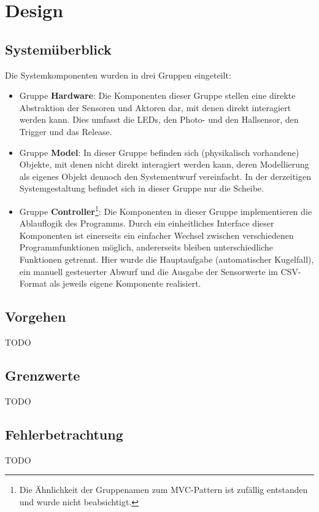 \chapter{Design}\label{k_design}
\section{Systemüberblick}
Die Systemkomponenten wurden in drei Gruppen eingeteilt:
\begin{itemize}
	\item Gruppe \textbf{Hardware}: Die Komponenten dieser Gruppe stellen eine direkte Abstraktion der Sensoren und Aktoren dar, mit denen direkt interagiert werden kann.
	Dies umfasst die LEDs, den Photo- und den Hallsensor, den Trigger und das Release.
	\item Gruppe \textbf{Model}: In dieser Gruppe befinden sich (physikalisch vorhandene) Objekte, mit denen nicht direkt interagiert werden kann, deren Modellierung als eigenes Objekt dennoch den Systementwurf vereinfacht.
	In der derzeitigen Systemgestaltung befindet sich in dieser Gruppe nur die Scheibe.
	\item Gruppe \textbf{Controller}\footnote{Die Ähnlichkeit der Gruppenamen zum MVC-Pattern ist zufällig entstanden und wurde nicht beabsichtigt.}:
	Die Komponenten in dieser Gruppe implementieren die Ablauflogik des Programms.
	Durch ein einheitliches Interface dieser Komponenten ist einerseits ein einfacher Wechsel zwischen verschiedenen Programmfunktionen möglich, andererseits bleiben unterschiedliche Funktionen getrennt.
	Hier wurde die Hauptaufgabe (automatischer Kugelfall), ein manuell gesteuerter Abwurf und die Ausgabe der Sensorwerte im CSV-Format als jeweils eigene Komponente realisiert.
\end{itemize}

\section{Vorgehen}
TODO

\section{Grenzwerte}
TODO

\section{Fehlerbetrachtung}
TODO